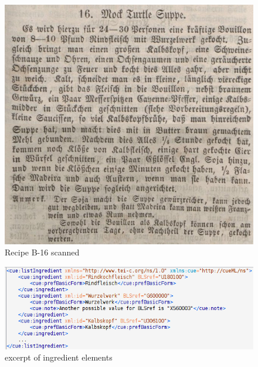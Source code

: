 \documentclass[12pt, twoside]{report}
\begin{document}
\newpage
\begin{figure}[H]
	\centering
	\includegraphics[width=1\textwidth]{../Images/B-16}
	\caption{Recipe B-16 scanned \parencite{DTA}}
	\label{fig:B16Scanned}
\end{figure}

\begin{figure}[H]
	\centering
	\includegraphics[width=1\textwidth]{Images/ingredientList}
	\caption{excerpt of ingredient elements}
	\label{fig:ingredientList}
\end{figure}
\end{document}
